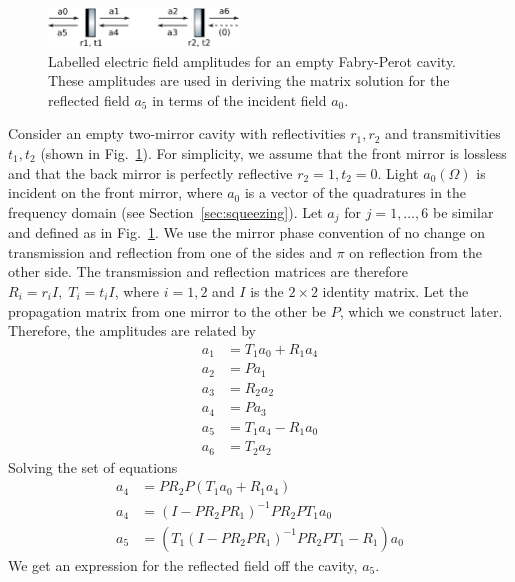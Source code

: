 \documentclass[aps,pra,superscriptaddress,reprint,nofootinbib]{revtex4-1}
\begin{document}
\begin{figure}[ht]
	\begin{center}
	\includegraphics[width=0.45\textwidth]{figures/empty_cavity_amplitudes.pdf}
	\end{center}
	\caption{Labelled electric field amplitudes for an empty Fabry-Perot cavity. These amplitudes are used in deriving the matrix solution for the reflected field $a_5$ in terms of the incident field $a_0$.}
	\label{fig:empty_cavity_amplitudes}
\end{figure}

Consider an empty two-mirror cavity with reflectivities $r_1, r_2$ and transmitivities $t_1, t_2$ (shown in Fig.~\ref{fig:empty_cavity_amplitudes}). For simplicity, we assume that the front mirror is lossless and that the back mirror is perfectly reflective $r_2 = 1, t_2 = 0$. Light $a_0(\Omega)$ is incident on the front mirror, where $a_0$ is a vector of the quadratures in the frequency domain (see Section~\ref{sec:squeezing}). Let $a_j$ for $j = 1, \ldots, 6$ be similar and defined as in Fig.~\ref{fig:empty_cavity_amplitudes}. We use the mirror phase convention of no change on transmission and reflection from one of the sides and $\pi$ on reflection from the other side. The transmission and reflection matrices are therefore $R_i = r_i I,\; T_i = t_i I$, where $i = 1, 2$ and $I$ is the $2 \times 2$ identity matrix. Let the propagation matrix from one mirror to the other be $P$, which we construct later. Therefore, the amplitudes are related by
\begin{align}
a_1 &= T_1 a_0 + R_1 a_4\\
a_2 &= P a_1\nonumber\\
a_3 &= R_2 a_2 \nonumber\\
a_4 &= P a_3\nonumber\\
a_5 &= T_1 a_4 - R_1 a_0\nonumber\\
a_6 &= T_2 a_2\nonumber
\end{align}
Solving the set of equations
\begin{align}
a_4 &= P R_2 P (T_1 a_0 + R_1 a_4) \\
a_4 &= (I - P R_2 P R_1)^{-1} P R_2 P T_1 a_0 \nonumber\\
a_5 &= \left(T_1 (I - P R_2 P R_1)^{-1} P R_2 P T_1 - R_1\right) a_0
\label{eq:empty_cav_refl}
\end{align}
We get an expression for the reflected field off the cavity, $a_5$.
\end{document}
